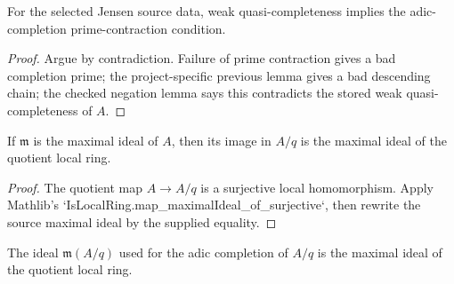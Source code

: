 \begin{lemma}
  \label{lem:bad_quotient_source_data_weakly_quasi_complete_to_adic_completion_prime_contraction_source}
  For the selected Jensen source data, weak quasi-completeness implies the
  adic-completion prime-contraction condition.
\end{lemma}

\begin{proof}
  Argue by contradiction.  Failure of prime contraction gives a bad completion
  prime; the project-specific previous lemma gives a bad descending chain; the
  checked negation lemma says this contradicts the stored weak
  quasi-completeness of \(A\).
\end{proof}

\begin{lemma}
  \label{lem:bad_quotient_source_data_quotient_adic_ideal_eq_maximal_ideal_of_source}
  If \(\mathfrak m\) is the maximal ideal of \(A\), then its image in \(A/q\)
  is the maximal ideal of the quotient local ring.
\end{lemma}

\begin{proof}
  The quotient map \(A\to A/q\) is a surjective local homomorphism.  Apply
  Mathlib's `IsLocalRing.map_maximalIdeal_of_surjective`, then rewrite the
  source maximal ideal by the supplied equality.
\end{proof}

\begin{lemma}
  \label{lem:bad_quotient_source_data_quotient_adic_ideal_eq_maximal_ideal_source}
  The ideal \(\mathfrak m(A/q)\) used for the adic completion of \(A/q\) is
  the maximal ideal of the quotient local ring.
\end{lemma}

